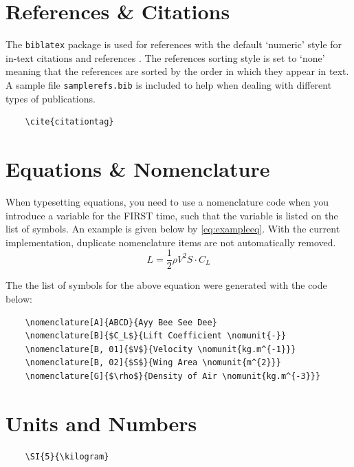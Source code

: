 \section{References \& Citations}
The \texttt{biblatex} package is used for references with the default `numeric' style for in-text citations and references \cite{sampleref}. The references sorting style is set to `none' meaning that the references are sorted by the order in which they appear in text. A sample file \texttt{samplerefs.bib} is included to help when dealing with different types of publications.

\begin{verbatim}
    \cite{citationtag}
\end{verbatim}

\section{Equations \& Nomenclature}
When typesetting equations, you need to use a nomenclature code when you introduce a variable for the FIRST time, such that the variable is listed on the list of symbols. An example is given below by \cref{eq:exampleeq}. With the current implementation, duplicate nomenclature items are not automatically removed.
\begin{equation}
\label{eq:exampleeq}
    L = \frac{1}{2}\rho V^2 S \cdot C_{L}
\end{equation}


The the list of symbols for the above equation were generated with the code below:

\begin{verbatim}
    \nomenclature[A]{ABCD}{Ayy Bee See Dee}
    \nomenclature[B]{$C_L$}{Lift Coefficient \nomunit{-}}
    \nomenclature[B, 01]{$V$}{Velocity \nomunit{kg.m^{-1}}}
    \nomenclature[B, 02]{$S$}{Wing Area \nomunit{m^{2}}}
    \nomenclature[G]{$\rho$}{Density of Air \nomunit{kg.m^{-3}}}
\end{verbatim}


\section{Units and Numbers}
\begin{verbatim}
    \SI{5}{\kilogram}
\end{verbatim}





